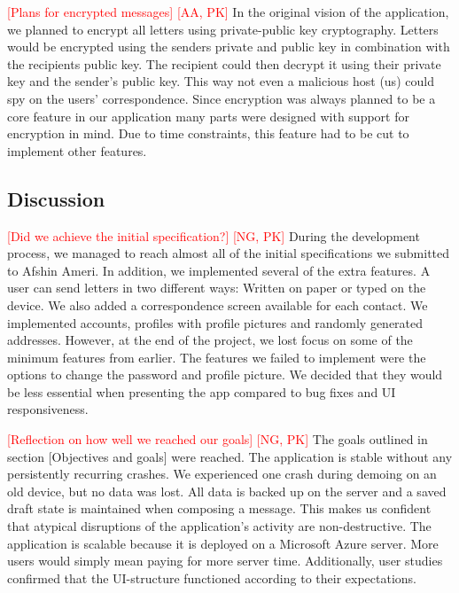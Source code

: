 \documentclass[acmlarge, review=false, screen=true]{acmart}
\begin{document}
      \textcolor{red}{[Plans for encrypted messages] [AA, PK]} \newline
      In the original vision of the application, we planned to encrypt all letters using private-public key cryptography. Letters would be encrypted using the senders private and public key in combination with the recipients public key. The recipient could then decrypt it using their private key and the sender's public key. This way not even a malicious host (us) could spy on the users’ correspondence. Since encryption was always planned to be a core feature in our application many parts were designed with support for encryption in mind. Due to time constraints, this feature had to be cut to implement other features.

    \subsection{Discussion}
      \textcolor{red}{[Did we achieve the initial specification?] [NG, PK]} \newline
      During the development process, we managed to reach almost all of the initial specifications we submitted to Afshin Ameri. In addition, we implemented several of the extra features. A user can send letters in two different ways: Written on paper or typed on the device. We also added a correspondence screen available for each contact. We implemented accounts, profiles with profile pictures and randomly generated addresses. However, at the end of the project, we lost focus on some of the minimum features from earlier. The features we failed to implement were the options to change the password and profile picture. We decided that they would be less essential when presenting the app compared to bug fixes and UI responsiveness.

      \textcolor{red}{[Reflection on how well we reached our goals] [NG, PK]} \newline
      The goals outlined in section [Objectives and goals] were reached. The application is stable without any persistently recurring crashes. We experienced one crash during demoing on an old device, but no data was lost. All data is backed up on the server and a saved draft state is maintained when composing a message. This makes us confident that atypical disruptions of the application’s activity are non-destructive. The application is scalable because it is deployed on a Microsoft Azure server. More users would simply mean paying for more server time. Additionally, user studies confirmed that the UI-structure functioned according to their expectations. 


      




  
\end{document}
